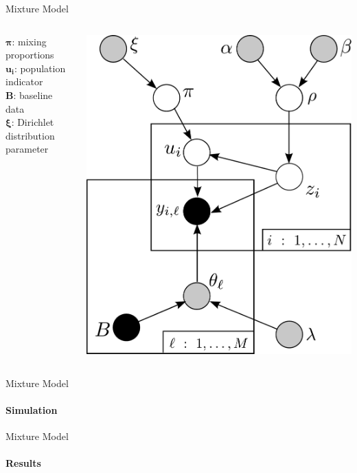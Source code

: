 \documentclass[letter,graphicx]{beamer}
\begin{document}
\begin{frame}{Mixture Model}
\begin{columns}[c]

\column{2in}
$\boldsymbol{\pi}$: mixing proportions \\
\vspace{3mm}
$\boldsymbol{u_i}$: population indicator \\
\vspace{3mm}
$\boldsymbol{B}$: baseline data\\
\vspace{3mm}
$\boldsymbol{\xi}$: Dirichlet distribution parameter

\column{2.25in}
\includegraphics[width=.9\textwidth]{images/DAG_2.pdf}

\end{columns}
\end{frame}

\begin{frame}{Mixture Model}
\framesubtitle{Simulation}
\end{frame}

\begin{frame}{Mixture Model}
\framesubtitle{Results}
\end{frame} 
 
\end{document}
